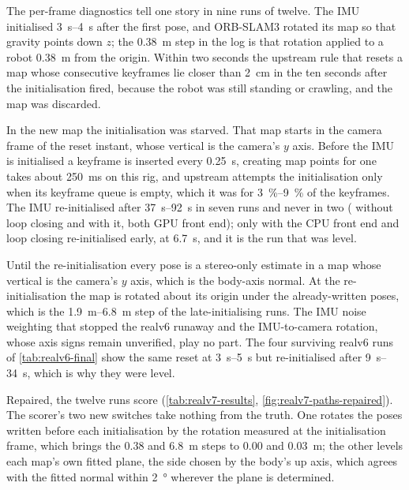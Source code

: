 \documentclass[11pt,a4paper,notitlepage]{report}
\begin{document}
The per-frame diagnostics tell one story in nine runs of twelve. The IMU
initialised \SIrange{3}{4}{\second} after the first pose, and ORB-SLAM3 rotated
its map so that gravity points down $z$; the \SI{0.38}{\metre} step in the log
is that rotation applied to a robot \SI{0.38}{\metre} from the origin. Within
two seconds the upstream rule that resets a map whose consecutive keyframes lie
closer than \SI{2}{\centi\metre} in the ten seconds after the initialisation
fired, because the robot was still standing or crawling, and the map was
discarded.

In the new map the initialisation was starved. That map starts in the camera
frame of the reset instant, whose vertical is the camera's $y$ axis. Before the
IMU is initialised a keyframe is inserted every \SI{0.25}{\second}, creating
map points for one takes about \SI{250}{\milli\second} on this rig, and
upstream attempts the initialisation only when its keyframe queue is empty,
which it was for \SIrange{3}{9}{\percent} of the keyframes. The IMU
re-initialised after \SIrange{37}{92}{\second} in seven runs and never in two
( without loop closing and  with it, both GPU front end);
only  with the CPU front end and loop closing re-initialised early, at
\SI{6.7}{\second}, and it is the run that was level.

Until the re-initialisation every pose is a stereo-only estimate in a map whose
vertical is the camera's $y$ axis, which is the body-axis normal. At the
re-initialisation the map is rotated about its origin under the already-written
poses, which is the \SIrange{1.9}{6.8}{\metre} step of the late-initialising
runs. The IMU noise weighting that stopped the realv6 runaway and the
IMU-to-camera rotation, whose axis signs remain unverified, play no part. The
four surviving realv6 runs of \cref{tab:realv6-final} show the same reset at
\SIrange{3}{5}{\second} but re-initialised after \SIrange{9}{34}{\second},
which is why they were level.

Repaired, the twelve runs score (\cref{tab:realv7-results},
\cref{fig:realv7-paths-repaired}). The scorer's two new switches take nothing
from the truth. One rotates the poses written before each initialisation by the
rotation measured at the initialisation frame, which brings the \SI{0.38}{} and
\SI{6.8}{\metre} steps to \SI{0.00}{} and \SI{0.03}{\metre}; the other levels
each map's own fitted plane, the side chosen by the body's up axis, which agrees
with the fitted normal within \SI{2}{\degree} wherever the plane is determined.
\end{document}
